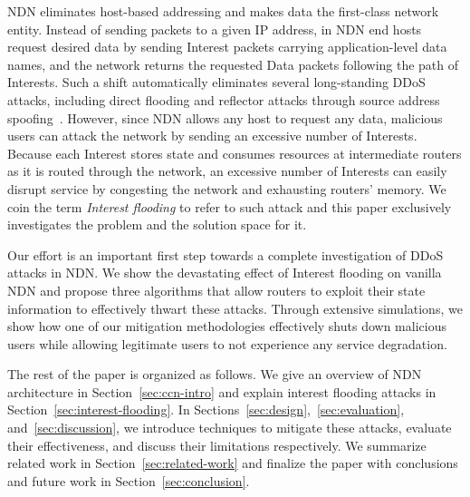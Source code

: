 NDN eliminates host-based addressing and makes data the first-class network entity. 
Instead of sending packets to a given IP address, in NDN end hosts request desired data by sending Interest packets carrying application-level data names, and the network returns the requested Data packets following the path of Interests. 
Such a shift automatically eliminates several long-standing DDoS attacks, including direct flooding and reflector attacks through source address spoofing~\cite{mirkovic2004taxonomy}.
%
However, since NDN allows any host to request any data, malicious users can attack the network by sending an excessive number of Interests. 
Because each Interest stores state and consumes resources at intermediate routers as it is routed through the network, an excessive number of Interests can easily disrupt service by congesting the network and exhausting routers' memory. 
We coin the term {\it Interest flooding} to refer to such attack and
this paper exclusively investigates the problem and the solution space for it. 

Our effort is an important first step towards a complete investigation of DDoS attacks in NDN. We show the devastating effect of Interest flooding on vanilla NDN and propose three algorithms that allow routers to exploit their state information to effectively thwart these attacks. Through extensive simulations,  we show how one of our mitigation methodologies effectively shuts down malicious users while allowing legitimate users to not experience any service degradation. 

The rest of the paper is organized as follows. We give an overview of NDN architecture in Section~\ref{sec:ccn-intro} and explain interest flooding attacks in Section~\ref{sec:interest-flooding}. In Sections~\ref{sec:design},~\ref{sec:evaluation}, and~\ref{sec:discussion}, we introduce techniques to mitigate these attacks, evaluate their effectiveness, and discuss their limitations respectively. We summarize related work in Section~\ref{sec:related-work} and finalize the paper with conclusions and future work in Section~\ref{sec:conclusion}.

